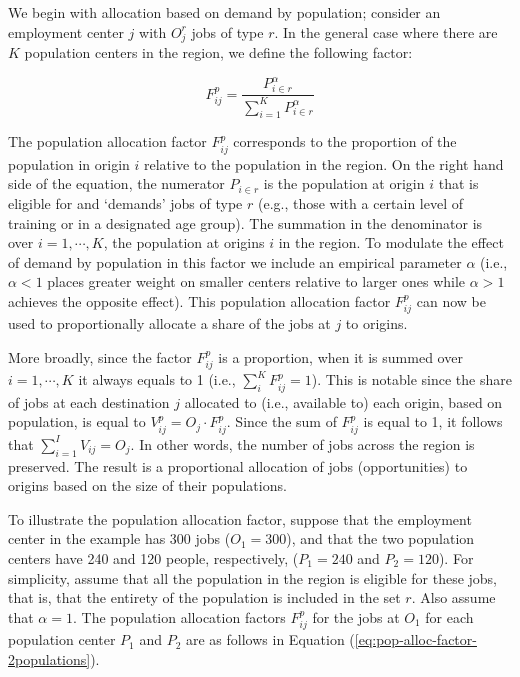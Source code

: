 \documentclass[]{elsarticle} %
\begin{document}
We begin with allocation based on demand by population; consider an
employment center \(j\) with \(O_j^r\) jobs of type \(r\). In the
general case where there are \(K\) population centers in the region, we
define the following factor:

\begin{equation}
\label{eq:pop-alloc-factor}
F^p_{ij} = \frac{P_{i\in r}^\alpha}{\sum_{i=1}^K P_{i\in r}^\alpha}
\end{equation}

The population allocation factor \(F^p_{ij}\) corresponds to the
proportion of the population in origin \(i\) relative to the population
in the region. On the right hand side of the equation, the numerator
\(P_{i\in r}\) is the population at origin \(i\) that is eligible for
and `demands' jobs of type \(r\) (e.g., those with a certain level of
training or in a designated age group). The summation in the denominator
is over \(i=1,\cdots,K\), the population at origins \(i\) in the region.
To modulate the effect of demand by population in this factor we include
an empirical parameter \(\alpha\) (i.e., \(\alpha <1\) places greater
weight on smaller centers relative to larger ones while \(\alpha>1\)
achieves the opposite effect). This population allocation factor
\(F^p_{ij}\) can now be used to proportionally allocate a share of the
jobs at \(j\) to origins.

More broadly, since the factor \(F^p_{ij}\) is a proportion, when it is
summed over \(i=1,\cdots,K\) it always equals to 1 (i.e.,
\(\sum_i^{K} F^p_{ij} = 1\)). This is notable since the share of jobs at
each destination \(j\) allocated to (i.e., available to) each origin,
based on population, is equal to \(V^p_{ij} = O_j \cdot F^p_{ij}\).
Since the sum of \(F^p_{ij}\) is equal to 1, it follows that
\(\sum_{i=1}^I V_{ij} = O_j\). In other words, the number of jobs across
the region is preserved. The result is a proportional allocation of jobs
(opportunities) to origins based on the size of their populations.

To illustrate the population allocation factor, suppose that the
employment center in the example has 300 jobs (\(O_1= 300\)), and that
the two population centers have 240 and 120 people, respectively,
(\(P_1= 240\) and \(P_2 = 120\)). For simplicity, assume that all the
population in the region is eligible for these jobs, that is, that the
entirety of the population is included in the set \(r\). Also assume
that \(\alpha=1\). The population allocation factors \(F^p_{ij}\) for
the jobs at \(O_1\) for each population center \(P_1\) and \(P_2\) are
as follows in Equation (\ref{eq:pop-alloc-factor-2populations}).
\end{document}

